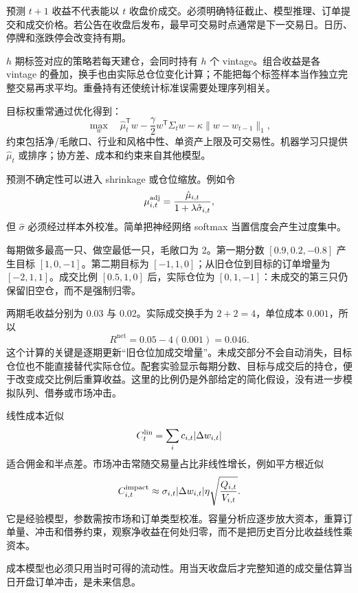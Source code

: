 
预测 $t+1$ 收益不代表能以 $t$ 收盘价成交。必须明确特征截止、模型推理、订单提交和成交价格。若公告在收盘后发布，最早可交易时点通常是下一交易日。日历、停牌和涨跌停会改变持有期。

$h$ 期标签对应的策略若每天建仓，会同时持有 $h$ 个 vintage。组合收益是各 vintage 的叠加，换手也由实际总仓位变化计算；不能把每个标签样本当作独立完整交易再求平均。重叠持有还使统计标准误需要处理序列相关。


目标权重常通过优化得到：
\[
\max_w\quad \hat\mu_t^{\mathsf T}w
-\frac\gamma2w^{\mathsf T}\Sigma_tw
-\kappa\|w-w_{t-1}\|_1,
\]
约束包括净/毛敞口、行业和风格中性、单资产上限及可交易性。机器学习只提供 $\hat\mu_t$ 或排序；协方差、成本和约束来自其他模型。

预测不确定性可以进入 shrinkage 或仓位缩放。例如令
\[
\mu_{i,t}^{\rm adj}=
\frac{\hat\mu_{i,t}}{1+\lambda\hat\sigma_{i,t}},
\]
但 $\hat\sigma$ 必须经过样本外校准。简单把神经网络 softmax 当置信度会产生过度集中。


每期做多最高一只、做空最低一只，毛敞口为 2。第一期分数 $[0.9,0.2,-0.8]$ 产生目标 $[1,0,-1]$。第二期目标为 $[-1,1,0]$；从旧仓位到目标的订单增量为 $[-2,1,1]$。成交比例 $[0.5,1,0]$ 后，实际仓位为 $[0,1,-1]$：未成交的第三只仍保留旧空仓，而不是强制归零。

两期毛收益分别为 $0.03$ 与 $0.02$。实际成交换手为 $2+2=4$，单位成本 $0.001$，所以
\[
R^{\mathrm{net}}=0.05-4(0.001)=0.046.
\]
这个计算的关键是逐期更新“旧仓位加成交增量”。未成交部分不会自动消失，目标仓位也不能直接替代实际仓位。配套实验显示每期分数、目标与成交后的持仓，便于改变成交比例后重算收益。这里的比例仍是外部给定的简化假设，没有进一步模拟队列、借券或市场冲击。


线性成本近似
\[
C_t^{\rm lin}=\sum_i c_{i,t}|\Delta w_{i,t}|
\]
适合佣金和半点差。市场冲击常随交易量占比非线性增长，例如平方根近似
\[
C_{i,t}^{\rm impact}\approx
\sigma_{i,t}|\Delta w_{i,t}|
\eta\sqrt{\frac{Q_{i,t}}{V_{i,t}}}.
\]
它是经验模型，参数需按市场和订单类型校准。容量分析应逐步放大资本，重算订单量、冲击和借券约束，观察净收益在何处归零，而不是把历史百分比收益线性乘资本。

成本模型也必须只用当时可得的流动性。用当天收盘后才完整知道的成交量估算当日开盘订单冲击，是未来信息。


